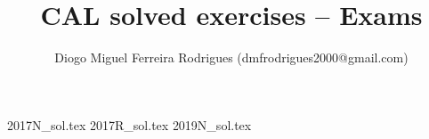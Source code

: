 \documentclass{cal}
\title{CAL solved exercises -- Exams}
\author{Diogo Miguel Ferreira Rodrigues (dmfrodrigues2000@gmail.com)}
\date{}
\begin{document}
\begingroup
\maketitle
    \let\clearpage\relax
	\tableofcontents
\endgroup
{2017N_sol.tex}
{2017R_sol.tex}
{2019N_sol.tex}
\end{document}

